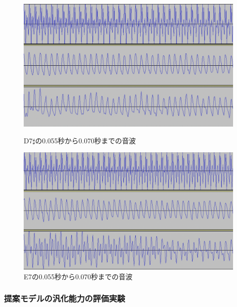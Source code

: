 \begin{figure}[b]
\begin{center}
\begin{minipage}{0.48\hsize}
\begin{center}
\includegraphics[width=0.9\hsize]{figure/88_88_det/d7s_0550_0700.png}
\caption{D7$\sharp$の0.055秒から0.070秒までの音波}
\label{fig:88_88_bad1}
\end{center}
\end{minipage}
\begin{minipage}{0.48\hsize}
\begin{center}
\includegraphics[width=0.9\hsize]{figure/88_88_det/e7_0550_0700.png}
\caption{E7の0.055秒から0.070秒までの音波}
\label{fig:88_88_bad2}
\end{center}
\end{minipage}
\end{center}
\end{figure}

\clearpage

\subsubsection{提案モデルの汎化能力の評価実験}

